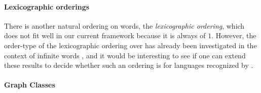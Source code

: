 \paragraph*{Lexicographic orderings} There is another natural ordering on
words, the \emph{lexicographic ordering}, which does not fit well in our
current framework because it is always of  $1$. However, the
order-type of the lexicographic ordering over  has
already been investigated in the context of infinite words \cite{CACOPU18}, and
it would be interesting to see if one can extend these results to decide
whether such an ordering is  for languages recognized by
.

\paragraph*{Graph Classes}


